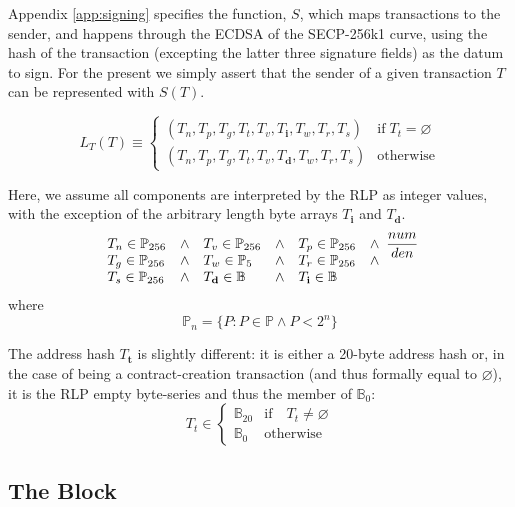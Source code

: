 \documentclass[9pt,oneside]{amsart}
\begin{document}
\begin{multicols}{2}
Appendix \ref{app:signing} specifies the function, $S$, which maps transactions to the sender, and happens through the ECDSA of the SECP-256k1 curve, using the hash of the transaction (excepting the latter three signature fields) as the datum to sign. For the present we simply assert that the sender of a given transaction $T$ can be represented with $S(T)$.

\begin{equation}
L_T(T) \equiv \begin{cases}
(T_n, T_p, T_g, T_t, T_v, T_\mathbf{i}, T_w, T_r, T_s) & \text{if} \; T_t = \varnothing\\
(T_n, T_p, T_g, T_t, T_v, T_\mathbf{d}, T_w, T_r, T_s) & \text{otherwise} 
\end{cases}
\end{equation}

Here, we assume all components are interpreted by the RLP as integer values, with the exception of the arbitrary length byte arrays $T_\mathbf{i}$ and $T_\mathbf{d}$.
\begin{equation}
\begin{array}[t]{lclclc}
T_n \in \mathbb{P}_{256} & \wedge & T_v \in \mathbb{P}_{256} & \wedge & T_p \in \mathbb{P}_{256} & \wedge \\
T_g \in \mathbb{P}_{256} & \wedge & T_w \in \mathbb{P}_5 & \wedge & T_r \in \mathbb{P}_{256} & \wedge \\
T_s \in \mathbb{P}_{256} & \wedge & T_\mathbf{d} \in \mathbb{B} & \wedge & T_\mathbf{i} \in \mathbb{B}
\end{array}\dfrac{num}{den}
\end{equation}
where
\begin{equation}
\mathbb{P}_n = \{ P: P \in \mathbb{P} \wedge P < 2^n \}
\end{equation}

The address hash $T_\mathbf{t}$ is slightly different: it is either a 20-byte address hash or, in the case of being a contract-creation transaction (and thus formally equal to $\varnothing$), it is the RLP empty byte-series and thus the member of $\mathbb{B}_0$:
\begin{equation}
T_t \in \begin{cases} \mathbb{B}_{20} & \text{if} \quad T_t \neq \varnothing \\
\mathbb{B}_{0} & \text{otherwise}\end{cases}
\end{equation}

\subsection{The Block} \label{ch:block}


\end{multicols}
\end{document}
